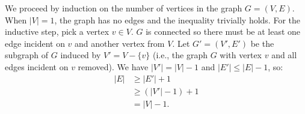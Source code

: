 We proceed by induction on the number of vertices in the graph $G=(V,E)$.
When $|V|=1$, the graph has no edges and the inequality trivially holds.
For the inductive step, pick a vertex $v\in V$.
$G$ is connected so there must be at least one edge incident on $v$ and another vertex from $V$.
Let $G'=(V',E')$ be the subgraph of $G$ induced by $V'=V-\{v\}$ (i.e., the graph $G$ with vertex $v$ and all edges incident on $v$ removed).
We have $|V'|=|V|-1$ and $|E'|\le |E|-1$, so:
\begin{align*}
    |E| &\ge |E'|+1 \\
    &\ge (|V'|-1)+1 \tag{by the inductive hypothesis applied for $G'$} \\
    &= |V|-1.
\end{align*}
